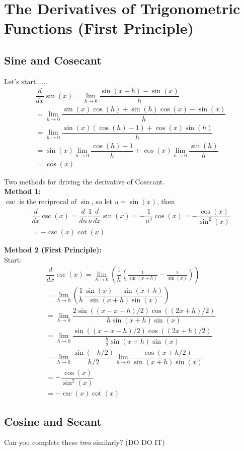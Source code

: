 \documentclass{article}
\theoremstyle{definition}
\theoremstyle{definition}
\theoremstyle{definition}
\theoremstyle{definition}
\theoremstyle{definition}
\theoremstyle{definition}
\theoremstyle{definition}
\theoremstyle{definition}
\theoremstyle{definition}
\begin{document}
\section{The Derivatives of Trigonometric Functions (First Principle)}
\subsection{Sine and Cosecant}
Let's start......
\begin{align*}
    \dfrac{d}{dx}\sin(x)=\lim_{h\to0}\dfrac{\sin(x+h)-\sin(x)}{h}\\
    =\lim_{h\to0}\dfrac{\sin(x)\cos(h)+\sin(h)\cos(x)-\sin(x)}{h}\\
    =\lim_{h\to0}\dfrac{\sin(x)(\cos(h)-1)+\cos(x)\sin(h)}{h}\\
    =\sin(x)\lim_{h\to0}\dfrac{\cos(h)-1}{h}+\cos(x)\lim_{h\to0}\dfrac{\sin(h)}{h}\\
    =\cos(x)
\end{align*}

Two methods for driving the derivative of Cosecant.\\
\textbf{Method 1:}\\
$\csc$ is the reciprocal of $\sin$, so let $u=\sin(x)$, then
\begin{align*}
    \dfrac{d}{dx}\csc(x)=\dfrac{d}{du}\dfrac{1}{u}\dfrac{d}{dx}\sin(x)=-\dfrac{1}{u^2}\cos(x)=-\dfrac{\cos(x)}{\sin^2(x)}\\
    =-\csc(x)\cot(x)
\end{align*}

\textbf{Method 2 (First Principle):}\\
Start:
\begin{align*}
    \dfrac{d}{dx}\csc(x)=\lim_{h\to0}\left(\dfrac{1}{h}\left(\frac{1}{\sin(x+h)}-\frac{1}{\sin(x)}\right)\right)\\
    =\lim_{h\to0}\left(\dfrac{1}{h}\dfrac{\sin(x)-\sin(x+h)}{\sin(x+h)\sin(x)}\right)\\
    =\lim_{h\to0}\dfrac{2\sin((x-x-h)/2)\cos((2x+h)/2)}{h\sin(x+h)\sin(x)}\\
    =\lim_{h\to0}\dfrac{\sin((x-x-h)/2)\cos((2x+h)/2)}{\frac{h}{2}\sin(x+h)\sin(x)}\\
    =\lim_{h\to0}\dfrac{\sin(-h/2)}{h/2}\lim_{h\to0}\dfrac{\cos(x+h/2)}{\sin(x+h)\sin(x)}\\
    =-\dfrac{\cos(x)}{\sin^2(x)}\\
    =-\csc(x)\cot(x)
\end{align*}
\subsection{Cosine and Secant}
Can you complete these two similarly? (DO DO IT)
\end{document}
